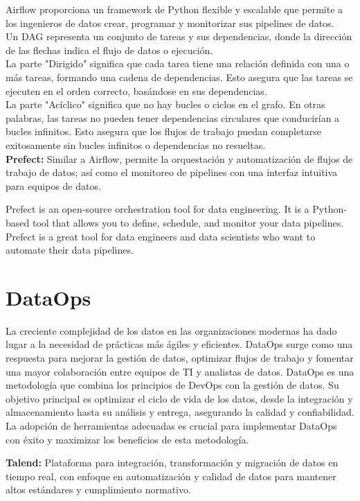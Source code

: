 \documentclass[12pt]{book}
\begin{document}
Airflow proporciona un framework de Python flexible y escalable que permite a los ingenieros de datos crear, programar y monitorizar sus pipelines de datos.\\
Un DAG representa un conjunto de tareas y sus dependencias, donde la dirección de las flechas indica el flujo de datos o ejecución.\\
La parte "Dirigido" significa que cada tarea tiene una relación definida con una o más tareas, formando una cadena de dependencias. Esto asegura que las tareas se ejecuten en el orden correcto, basándose en sus dependencias.\\
La parte "Acíclico" significa que no hay bucles o ciclos en el grafo. En otras palabras, las tareas no pueden tener dependencias circulares que conducirían a bucles infinitos. Esto asegura que los flujos de trabajo puedan completarse exitosamente sin bucles infinitos o dependencias no resueltas.\\

\textbf{Prefect:} Similar a Airflow, permite la orquestación y automatización de flujos de trabajo de datos; así como el monitoreo de pipelines con una interfaz intuitiva para equipos de datos. 

Prefect is an open-source orchestration tool for data engineering. It is a Python-based tool that allows you to define, schedule, and monitor your data pipelines. Prefect is a great tool for data engineers and data scientists who want to automate their data pipelines.\\

\section{DataOps}

La creciente complejidad de los datos en las organizaciones modernas ha dado lugar a la necesidad de prácticas más ágiles y eficientes. DataOps surge como una respuesta para mejorar la gestión de datos, optimizar flujos de trabajo y fomentar una mayor colaboración entre equipos de TI y analistas de datos. 
DataOps es una metodología que combina los principios de DevOps con la gestión de datos. Su objetivo principal es optimizar el ciclo de vida de los datos, desde la integración y almacenamiento hasta su análisis y entrega, asegurando la calidad y confiabilidad. La adopción de herramientas adecuadas es crucial para implementar DataOps con éxito y maximizar los beneficios de esta metodología.

\textbf{Talend:} Plataforma para integración, transformación y migración de datos en tiempo real, con enfoque en automatización y calidad de datos para mantener altos estándares y cumplimiento normativo.
\end{document}
